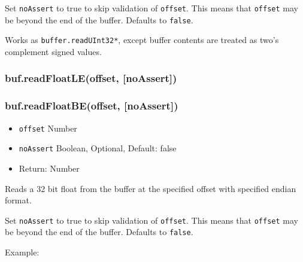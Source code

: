 Set \texttt{noAssert} to true to skip validation of \texttt{offset}.
This means that \texttt{offset} may be beyond the end of the buffer.
Defaults to \texttt{false}.

Works as \texttt{buffer.readUInt32*}, except buffer contents are treated
as two's complement signed values.

\subsubsection{buf.readFloatLE(offset,
{[}noAssert{]})}\label{buf.readfloatleoffset-noassert}

\subsubsection{buf.readFloatBE(offset,
{[}noAssert{]})}\label{buf.readfloatbeoffset-noassert}

\begin{itemize}
\itemsep1pt\parskip0pt
\item
  \texttt{offset} Number
\item
  \texttt{noAssert} Boolean, Optional, Default: false
\item
  Return: Number
\end{itemize}

Reads a 32 bit float from the buffer at the specified offset with
specified endian format.

Set \texttt{noAssert} to true to skip validation of \texttt{offset}.
This means that \texttt{offset} may be beyond the end of the buffer.
Defaults to \texttt{false}.

Example:

\begin{Shaded}
\begin{Highlighting}[]
  \NormalTok{(}\NormalTok{);}

\NormalTok{buf[}\NormalTok{] = }\NormalTok{;}
\NormalTok{buf[}\NormalTok{] = }\NormalTok{;}
\NormalTok{buf[}\NormalTok{] = }\NormalTok{;}
\NormalTok{buf[}\NormalTok{] = }\NormalTok{;}

\NormalTok{(}\NormalTok{(}\NormalTok{));}

\end{Highlighting}
\end{Shaded}


